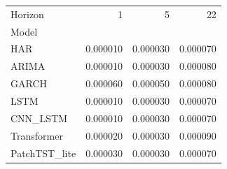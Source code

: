 \begin{tabular}{lrrr}
\toprule
Horizon & 1 & 5 & 22 \\
Model &  &  &  \\
\midrule
HAR & 0.000010 & 0.000030 & 0.000070 \\
ARIMA & 0.000010 & 0.000030 & 0.000080 \\
GARCH & 0.000060 & 0.000050 & 0.000080 \\
LSTM & 0.000010 & 0.000030 & 0.000070 \\
CNN_LSTM & 0.000010 & 0.000030 & 0.000070 \\
Transformer & 0.000020 & 0.000030 & 0.000090 \\
PatchTST_lite & 0.000030 & 0.000030 & 0.000070 \\
\bottomrule
\end{tabular}
